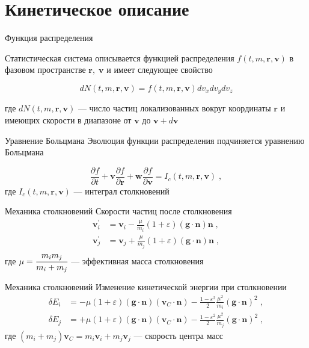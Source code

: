\documentclass[10pt]{beamer}
\newcommand{\pd}{\partial}
\newcommand{\br}{\bm{r}}
\newcommand{\bv}{\bm{v}}
\newcommand{\bw}{\bm{w}}
\newcommand{\bg}{\bm{g}}
\newcommand{\bn}{\bm{n}}
\begin{document}
\section{Кинетическое описание}

\begin{frame}{Функция распределения}
  
  Статистическая система описывается функцией распределения $f(t,m,\br,\bv)$ в фазовом пространстве $\br,\;\bv$
  и имеет следующее свойство

  \begin{equation}
    dN(t,m,\br,\bv)=f(t,m,\br,\bv)dv_xdv_ydv_z
  \end{equation}

  где $dN(t,m,\br,\bv)$ --- число частиц локализованных вокруг координаты $\br$ и имеющих скорости
  в диапазоне от $\bv$ до $\bv+d\bv$

\end{frame}

\begin{frame}[fragile]{Уравнение Больцмана}
	Эволюция функции распределения подчиняется уравнению Больцмана

  \begin{equation}
    \frac{\pd f}{\pd t}+\bv\frac{\pd f}{\pd\br}+\bw\frac{\pd f}{\pd\bv}=I_c(t,m,\br,\bv)\;,
  \end{equation}
  где $I_c(t,m,\br,\bv)$ --- интеграл столкновений
  
\end{frame}

\begin{frame}[fragile]{Механика столкновений}
  Скорости частиц после столкновения
  \begin{equation}
    \begin{split}
      \bv^{'}_i&=\bv_i-\frac{\mu}{m_i}(1+\varepsilon)(\bg\cdot\bn)\bn\;,\\
      \bv^{'}_j&=\bv_j+\frac{\mu}{m_j}(1+\varepsilon)(\bg\cdot\bn)\bn\;,
    \end{split}
  \end{equation}
  где $\mu=\cfrac{m_im_j}{m_i+m_j}$ --- эффективная масса столкновения
\end{frame}

\begin{frame}[fragile]{Механика столкновений}
  Изменение кинетической энергии при столкновении
  \begin{equation}
    \begin{split}
      \delta E_i&=-\mu(1+\varepsilon)(\bg\cdot\bn)(\bv_C\cdot\bn)-\frac{1-\varepsilon^2}{2}\frac{\mu^2}{m_i}(\bg\cdot\bn)^2\;,\\
      \delta E_j&=+\mu(1+\varepsilon)(\bg\cdot\bn)(\bv_C\cdot\bn)-\frac{1-\varepsilon^2}{2}\frac{\mu^2}{m_j}(\bg\cdot\bn)^2\;,
    \end{split}
  \end{equation}
  где $(m_i+m_j)\bv_C=m_i\bv_i+m_j\bv_j$ --- скорость центра масс
\end{frame}
\end{document}
